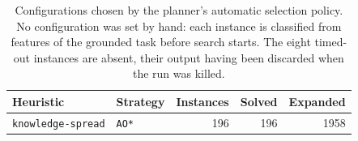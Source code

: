 \begin{table}[H]
\centering
\small
\caption{Configurations chosen by the planner's automatic selection policy.
No configuration was set by hand: each instance is classified from features of
the grounded task before search starts. The eight timed-out instances are
absent, their output having been discarded when the run was killed.}
\label{tab:selection}
\begin{tabular}{@{}l l r r r@{}}
\toprule
\textbf{Heuristic} & \textbf{Strategy} & \textbf{Instances} & \textbf{Solved} & \textbf{Expanded} \\
\midrule
\texttt{knowledge-spread} & \texttt{AO*} & 196 & 196 & 1958 \\
\bottomrule
\end{tabular}
\end{table}
